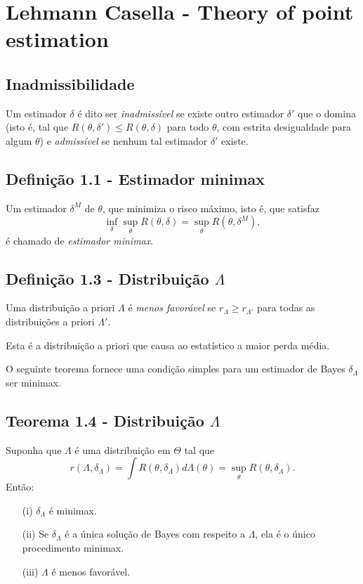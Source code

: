 \section{Lehmann Casella - Theory of point estimation}

\subsection{Inadmissibilidade}
Um estimador \( \delta \) é dito ser \textit{inadmissível} se existe outro estimador \( \delta' \) que o domina (isto é, tal que \( R(\theta, \delta') \leq R(\theta, \delta) \) para todo \( \theta \), com estrita desigualdade para algum \( \theta \)) e \textit{admissível} se nenhum tal estimador \( \delta' \) existe.

\subsection{Definição 1.1 - Estimador minimax} Um estimador $\delta^M$ de $\theta$, que minimiza o risco máximo, isto é, que satisfaz
\[
\inf_{\delta} \sup_{\theta} R(\theta, \delta) = \sup_{\theta} R(\theta, \delta^M),
\]
é chamado de \textit{estimador minimax}.

\subsection{Definição 1.3 - Distribuição \texorpdfstring{\(\Lambda\)}{undefined}} Uma distribuição a priori $\Lambda$ é \textit{menos favorável} se $r_{\Lambda} \geq r_{\Lambda'}$ para todas as distribuições a priori $\Lambda'$.

Esta é a distribuição a priori que causa ao estatístico a maior perda média.

O seguinte teorema fornece uma condição simples para um estimador de Bayes $\delta_{\Lambda}$ ser minimax.

\subsection{Teorema 1.4 - Distribuição \texorpdfstring{\(\Lambda\)}{undefined}}
Suponha que $\Lambda$ é uma distribuição em $\Theta$ tal que
\[
r(\Lambda, \delta_{\Lambda}) = \int R(\theta, \delta_{\Lambda}) d\Lambda(\theta) = \sup_{\theta} R(\theta, \delta_{\Lambda}).
\]
Então:
\begin{itemize}
\item[(i)] $\delta_{\Lambda}$ é minimax.
\item[(ii)] Se $\delta_{\Lambda}$ é a única solução de Bayes com respeito a $\Lambda$, ela é o único procedimento minimax.
\item[(iii)] $\Lambda$ é menos favorável.
\end{itemize}

